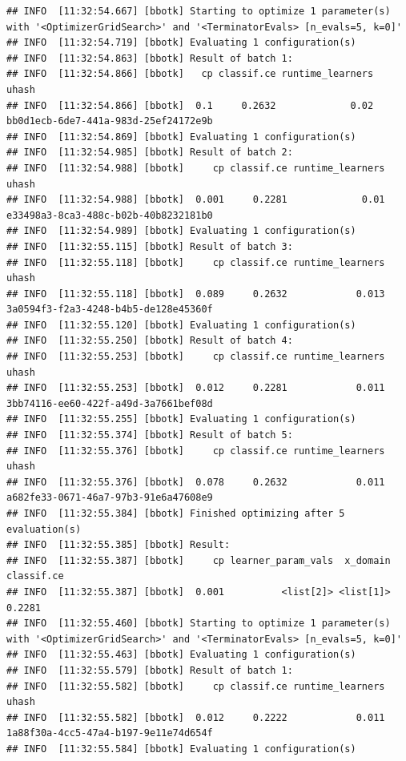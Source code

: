 \documentclass[
]{scrbook}
\begin{document}
\begin{verbatim}
## INFO  [11:32:54.667] [bbotk] Starting to optimize 1 parameter(s) with '<OptimizerGridSearch>' and '<TerminatorEvals> [n_evals=5, k=0]' 
## INFO  [11:32:54.719] [bbotk] Evaluating 1 configuration(s) 
## INFO  [11:32:54.863] [bbotk] Result of batch 1: 
## INFO  [11:32:54.866] [bbotk]   cp classif.ce runtime_learners                                uhash 
## INFO  [11:32:54.866] [bbotk]  0.1     0.2632             0.02 bb0d1ecb-6de7-441a-983d-25ef24172e9b 
## INFO  [11:32:54.869] [bbotk] Evaluating 1 configuration(s) 
## INFO  [11:32:54.985] [bbotk] Result of batch 2: 
## INFO  [11:32:54.988] [bbotk]     cp classif.ce runtime_learners                                uhash 
## INFO  [11:32:54.988] [bbotk]  0.001     0.2281             0.01 e33498a3-8ca3-488c-b02b-40b8232181b0 
## INFO  [11:32:54.989] [bbotk] Evaluating 1 configuration(s) 
## INFO  [11:32:55.115] [bbotk] Result of batch 3: 
## INFO  [11:32:55.118] [bbotk]     cp classif.ce runtime_learners                                uhash 
## INFO  [11:32:55.118] [bbotk]  0.089     0.2632            0.013 3a0594f3-f2a3-4248-b4b5-de128e45360f 
## INFO  [11:32:55.120] [bbotk] Evaluating 1 configuration(s) 
## INFO  [11:32:55.250] [bbotk] Result of batch 4: 
## INFO  [11:32:55.253] [bbotk]     cp classif.ce runtime_learners                                uhash 
## INFO  [11:32:55.253] [bbotk]  0.012     0.2281            0.011 3bb74116-ee60-422f-a49d-3a7661bef08d 
## INFO  [11:32:55.255] [bbotk] Evaluating 1 configuration(s) 
## INFO  [11:32:55.374] [bbotk] Result of batch 5: 
## INFO  [11:32:55.376] [bbotk]     cp classif.ce runtime_learners                                uhash 
## INFO  [11:32:55.376] [bbotk]  0.078     0.2632            0.011 a682fe33-0671-46a7-97b3-91e6a47608e9 
## INFO  [11:32:55.384] [bbotk] Finished optimizing after 5 evaluation(s) 
## INFO  [11:32:55.385] [bbotk] Result: 
## INFO  [11:32:55.387] [bbotk]     cp learner_param_vals  x_domain classif.ce 
## INFO  [11:32:55.387] [bbotk]  0.001          <list[2]> <list[1]>     0.2281 
## INFO  [11:32:55.460] [bbotk] Starting to optimize 1 parameter(s) with '<OptimizerGridSearch>' and '<TerminatorEvals> [n_evals=5, k=0]' 
## INFO  [11:32:55.463] [bbotk] Evaluating 1 configuration(s) 
## INFO  [11:32:55.579] [bbotk] Result of batch 1: 
## INFO  [11:32:55.582] [bbotk]     cp classif.ce runtime_learners                                uhash 
## INFO  [11:32:55.582] [bbotk]  0.012     0.2222            0.011 1a88f30a-4cc5-47a4-b197-9e11e74d654f 
## INFO  [11:32:55.584] [bbotk] Evaluating 1 configuration(s) 

\end{verbatim}
\end{document}
